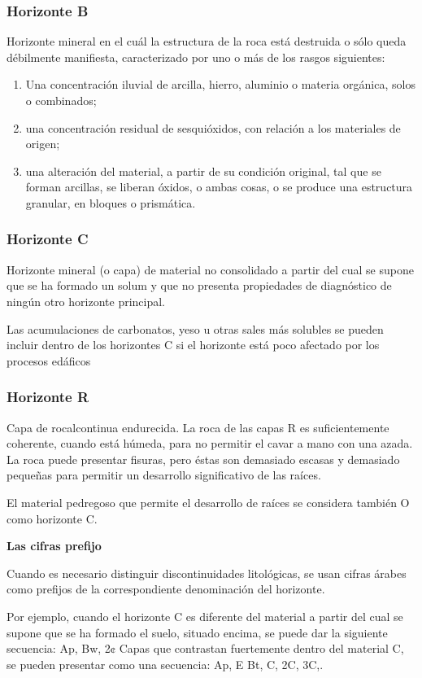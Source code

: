 \subsubsection{Horizonte B}

Horizonte mineral en el cuál la estructura de
la roca está destruida o sólo queda
débilmente manifiesta, caracterizado por uno
o más de los rasgos siguientes:
\begin{enumerate}
    \item Una concentración iluvial de arcilla, hierro, aluminio o materia orgánica, solos o combinados;
    \item una concentración residual de sesquióxidos, con relación a los materiales de origen;
    \item una alteración del material, a partir de su condición original, tal que se forman arcillas, se liberan óxidos, o ambas cosas, o se produce una estructura granular, en bloques o prismática.
\end{enumerate}

\subsubsection{Horizonte C}
Horizonte mineral (o capa) de material no consolidado a partir del cual se supone que se ha formado un solum y que no presenta propiedades de diagnóstico de ningún otro horizonte principal.

Las acumulaciones de carbonatos, yeso u otras sales más solubles se pueden incluir dentro de los horizontes C si el horizonte está poco afectado por los procesos edáficos
\subsubsection{Horizonte R}
Capa de rocalcontinua endurecida. La roca de las capas R es suficientemente coherente, cuando está húmeda, para no permitir el cavar a mano con una azada. La roca puede presentar fisuras, pero éstas son demasiado escasas y demasiado pequeñas para permitir un desarrollo significativo de las raíces.

El material pedregoso que permite el desarrollo de raíces se considera también O como horizonte C.

\textbf{Las cifras prefijo}

Cuando es necesario distinguir discontinuidades litológicas, se usan cifras árabes como prefijos de la correspondiente denominación del horizonte.

Por ejemplo, cuando el horizonte C es diferente del material a partir del cual se supone que se ha formado el suelo, situado encima, se puede dar la siguiente secuencia: Ap, Bw, 2¢ Capas que contrastan fuertemente dentro del material C, se pueden presentar como una secuencia: Ap, E Bt, C, 2C, 3C,.

